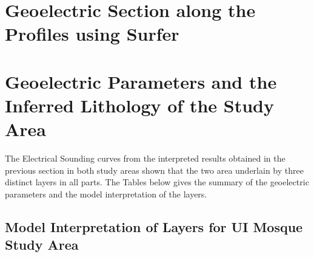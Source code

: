 \documentclass[12pt,a4paper]{report}
\begin{document}
\section{Geoelectric Section along the Profiles using Surfer}

\section{Geoelectric Parameters and the Inferred Lithology of the Study Area}
The Electrical Sounding curves from the interpreted results obtained in the previous section in both study areas shown that the two area underlain by three distinct layers in all parts. The Tables below gives the summary of the geoelectric parameters and the model interpretation of the layers. 

\subsection{Model Interpretation of Layers for UI Mosque Study Area}
\end{document}
